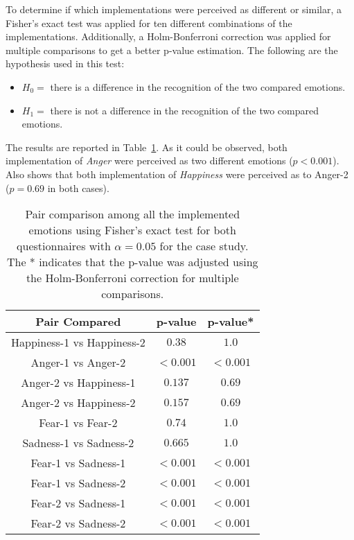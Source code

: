 To determine if which implementations were perceived as different or similar, a Fisher's exact test was applied for ten different combinations of the implementations. Additionally, a Holm-Bonferroni correction was applied for multiple comparisons to get a better p-value estimation. The following are the hypothesis used in this test:

\begin{itemize}
	\item $H_0 = $ there is a difference in the recognition of the two compared emotions.
	\item $H_1 = $ there is not a difference in the recognition of the two compared emotions.
\end{itemize}

The results are reported in Table~\ref{table:result_compare_fourth}. As it could be observed, both implementation of \textit{Anger} were perceived as two different emotions ($p<0.001$). Also shows that both implementation of \textit{Happiness} were perceived as to Anger-2 ($p=0.69$ in both cases).

\begin{table}
\centering
\small
\caption{Pair comparison among all the implemented emotions using Fisher's exact test for both questionnaires with $\alpha = 0.05$ for the  case study. The * indicates that the p-value was adjusted using the Holm-Bonferroni correction for multiple comparisons.}
		\label{table:result_compare_fourth}
		\begin{tabular}{|c|c|c|}
			\hline	
\textbf{Pair Compared} & \textbf{p-value} & \textbf{p-value*}\\	
			\hline
			Happiness-1 vs Happiness-2 &$0.38$&$1.0$\\
			\hline
			Anger-1 vs Anger-2 & $<0.001$ 
			& $<0.001$
			\\
			\hline
			Anger-2 vs Happiness-1 & $0.137$&$0.69$\\
			\hline
			Anger-2 vs Happiness-2 & $0.157$&$0.69$\\
			\hline
			Fear-1 vs Fear-2 & $0.74$&$1.0$\\
			\hline
			Sadness-1 vs Sadness-2 & $0.665$&$1.0$\\
			\hline
			Fear-1 vs Sadness-1& $<0.001$ 
			& $<0.001$
			\\
			\hline
			Fear-1 vs Sadness-2 & $<0.001$
			& $<0.001$
			\\
			\hline
			Fear-2 vs Sadness-1 & $<0.001$
			& $<0.001$
			\\
			\hline
			Fear-2 vs Sadness-2 & $<0.001$
			& $<0.001$
			\\
			\hline
			\end{tabular}
\end{table}  
 
